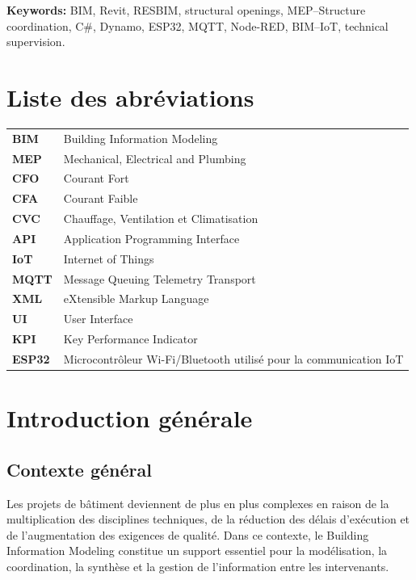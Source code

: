\documentclass[12pt,a4paper]{report}
\begin{document}
\textbf{Keywords:} BIM, Revit, RESBIM, structural openings, MEP--Structure coordination, C\#, Dynamo, ESP32, MQTT, Node-RED, BIM--IoT, technical supervision.

\chapter*{Liste des abréviations}
\begin{longtable}{>{\bfseries}p{3cm}p{10.5cm}}
BIM & Building Information Modeling \\
MEP & Mechanical, Electrical and Plumbing \\
CFO & Courant Fort \\
CFA & Courant Faible \\
CVC & Chauffage, Ventilation et Climatisation \\
API & Application Programming Interface \\
IoT & Internet of Things \\
MQTT & Message Queuing Telemetry Transport \\
XML & eXtensible Markup Language \\
UI & User Interface \\
KPI & Key Performance Indicator \\
ESP32 & Microcontrôleur Wi-Fi/Bluetooth utilisé pour la communication IoT \\
\end{longtable}

\clearpage
\tableofcontents
\thispagestyle{empty}
\clearpage
\listoffigures
\thispagestyle{empty}
\clearpage
\listoftables
\thispagestyle{empty}

\clearpage
{}

\chapter*{Introduction générale}

\section*{Contexte général}
Les projets de bâtiment deviennent de plus en plus complexes en raison de la multiplication des disciplines techniques, de la réduction des délais d'exécution et de l'augmentation des exigences de qualité. Dans ce contexte, le Building Information Modeling constitue un support essentiel pour la modélisation, la coordination, la synthèse et la gestion de l'information entre les intervenants.
\end{document}
